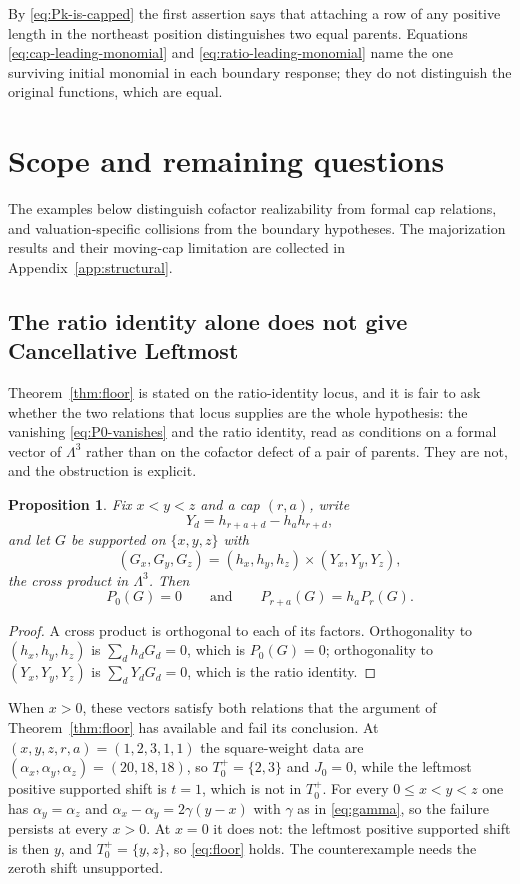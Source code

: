 \documentclass[11pt,a4paper]{amsart}
\numberwithin{equation}{section}
\theoremstyle{plain}
\newtheorem{proposition}[theorem]{Proposition}
\theoremstyle{definition}
\newcommand{\Lam}{\Lambda}
\begin{document}
By \eqref{eq:Pk-is-capped} the first assertion says that attaching a row of
any positive length in the northeast position distinguishes two equal
parents.  Equations \eqref{eq:cap-leading-monomial} and
\eqref{eq:ratio-leading-monomial} name the one surviving initial monomial in
each boundary response; they do not distinguish the original functions,
which are equal.

\section{Scope and remaining questions}\label{sec:scope}

The examples below distinguish cofactor realizability from formal cap
relations, and valuation-specific collisions from the boundary hypotheses.
The majorization results and their moving-cap limitation are collected in
Appendix~\ref{app:structural}.

\subsection{The ratio identity alone does not give Cancellative Leftmost}\label{subsec:elbow}

Theorem~\ref{thm:floor} is stated on the ratio-identity locus, and it is fair to ask whether the two relations that locus supplies are the whole hypothesis: the vanishing \eqref{eq:P0-vanishes} and the ratio identity, read as conditions on a formal vector of \(\Lam^3\) rather than on the cofactor defect of a pair of parents.  They are not, and the obstruction is explicit.

\begin{proposition}\label{prop:elbow}
Fix \(x<y<z\) and a cap \((r,a)\), write
\[
Y_d=h_{r+a+d}-h_ah_{r+d},
\]
and let \(G\) be supported on \(\{x,y,z\}\) with
\[
(G_x,G_y,G_z)
=
(h_x,h_y,h_z)\times(Y_x,Y_y,Y_z),
\]
the cross product in \(\Lam^3\).  Then
\[
P_0(G)=0
\qquad\text{and}\qquad
P_{r+a}(G)=h_aP_r(G).
\]
\end{proposition}

\begin{proof}
A cross product is orthogonal to each of its factors.  Orthogonality to \((h_x,h_y,h_z)\) is \(\sum_dh_dG_d=0\), which is \(P_0(G)=0\); orthogonality to \((Y_x,Y_y,Y_z)\) is \(\sum_dY_dG_d=0\), which is the ratio identity.
\end{proof}

When \(x>0\), these vectors satisfy both relations that the argument of Theorem~\ref{thm:floor} has available and fail its conclusion.  At \((x,y,z,r,a)=(1,2,3,1,1)\) the square-weight data are \((\alpha_x,\alpha_y,\alpha_z)=(20,18,18)\),
so \(T_0^+=\{2,3\}\) and \(J_0=0\), while the leftmost positive supported shift is \(t=1\), which is not in \(T_0^+\).  For every \(0\le x<y<z\) one has \(\alpha_y=\alpha_z\) and \(\alpha_x-\alpha_y=2\gamma(y-x)\)
with \(\gamma\) as in \eqref{eq:gamma}, so the failure persists at every \(x>0\).  At \(x=0\) it does not: the leftmost positive supported shift is then \(y\), and \(T_0^+=\{y,z\}\), so \eqref{eq:floor} holds.  The counterexample needs the zeroth shift unsupported.
\end{document}
